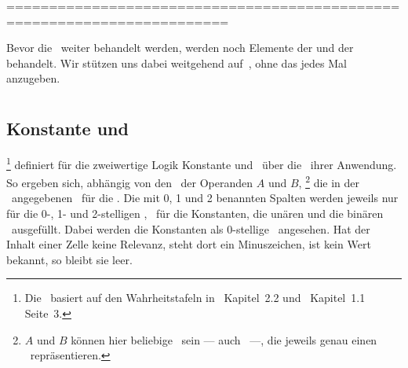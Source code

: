 ========================================================================

Bevor die \Schlussregeln\ weiter behandelt werden, werden noch Elemente der \emph{\Aussagenlogik} und der \emph{\Praedikatenlogik} behandelt.
Wir stützen uns dabei weitgehend auf~\cite{bib:Rautenberg}, ohne das jedes Mal anzugeben.

\section[Aussagenlogik]{\Aussagenlogik}%
\beginsection          {\Aussagenlogik}
\label              {sec-Aussagenlogik}

\color{gray}%
\subsection[Konstante und Operationen]{Konstante und \Operationen}%
\label               {sub-Operationen}

%
\footnote{%
	Die \tablename\ basiert auf den Wahrheitstafeln in~\cite{bib:JunktorMoeglich} Kapitel~2.2 und~\cite{bib:Rautenberg} Kapitel~1.1 Seite~3.
}
definiert für die zweiwertige Logik Konstante und \Junktoren\ über die \Wahrheitswerte\ ihrer Anwendung.
So ergeben sich, abhängig von den \Wahrheitswerten\ der Operanden $A$ und $B$,%
\footnote{%
	$A$ und $B$ können hier beliebige \Aussagen\ sein --- auch \Formeln\ ---, die jeweils genau einen \Wahrheitswert\ repräsentieren.
}
die in der \tablename\ angegebenen \Wahrheitswerte\ für die \Operationen.
Die mit 0, 1 und 2 benannten Spalten werden jeweils nur für die 0-, 1- und 2-stelligen \Junktoren, \textdh\ für die Konstanten, die unären und die binären \Junktoren\ ausgefüllt.
Dabei werden die Konstanten als 0-stellige \Junktoren\ angesehen.
Hat der Inhalt einer Zelle keine Relevanz, steht dort ein Minuszeichen, ist kein Wert bekannt, so bleibt sie leer.

